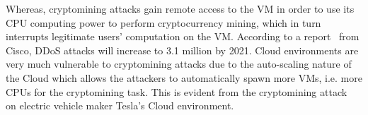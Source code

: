 Whereas, cryptomining attacks gain remote access to the VM in order to use its CPU computing power to perform cryptocurrency mining, which in turn interrupts legitimate users' computation on the VM. 
According to a report~\cite{cisco} from Cisco, DDoS attacks 
will increase to 3.1 million by 2021. 
Cloud environments are very much vulnerable to cryptomining attacks due to the auto-scaling nature of the Cloud which allows the attackers to automatically spawn more VMs, i.e. more CPUs for the cryptomining task. This is evident from the cryptomining attack~\cite{tesla} on electric vehicle maker Tesla's Cloud environment. 

